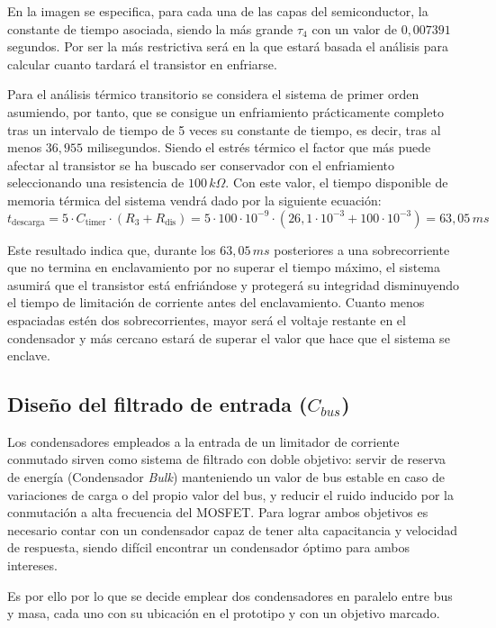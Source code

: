 \documentclass[12pt]{report} %
\begin{document}
En la imagen se especifica, para cada una de las capas del semiconductor, la constante de tiempo asociada, siendo la más grande $\tau_\text{4}$ con un valor de $0{,}007391$ segundos. Por ser la más restrictiva será en la que estará basada el análisis para calcular cuanto tardará el transistor en enfriarse. 

Para el análisis térmico transitorio se considera el sistema de primer orden asumiendo, por tanto, que se consigue un enfriamiento prácticamente completo tras un intervalo de tiempo de 5 veces su constante de tiempo, es decir, tras al menos $36{,}955$ milisegundos. Siendo el estrés térmico el factor que más puede afectar al transistor se ha buscado ser conservador con el enfriamiento seleccionando una resistencia de $100\,k\Omega$. Con este valor, el tiempo disponible de memoria térmica del sistema vendrá dado por la siguiente ecuación:\begin{equation}
    \label{eq:tauDescarga}
    t_\text{descarga} = 5\cdot C_\text{timer} \cdot (R_\text{3}+R_\text{dis})=5\cdot 100\cdot 10^{-9} \cdot (26{,}1 \cdot 10^{-3}+ 100\cdot 10^{-3}) = 63{,}05\, ms
\end{equation}

Este resultado indica que, durante los $63{,}05\, ms$ posteriores a una sobrecorriente que no termina en enclavamiento por no superar el tiempo máximo, el sistema asumirá que el transistor está enfriándose y protegerá su integridad disminuyendo el tiempo de limitación de corriente antes del enclavamiento. Cuanto menos espaciadas estén dos sobrecorrientes, mayor será el voltaje restante en el condensador y más cercano estará de superar el valor que hace que el sistema se enclave. 


\subsection{Diseño del filtrado de entrada ($C_{bus}$)}
Los condensadores empleados a la entrada de un limitador de corriente conmutado sirven como sistema de filtrado con doble objetivo: servir de reserva de energía (Condensador \textit{Bulk}) manteniendo un valor de bus estable en caso de variaciones de carga o del propio valor del bus, y reducir el ruido inducido por la conmutación a alta frecuencia del MOSFET. Para lograr ambos objetivos es necesario contar con un condensador capaz de tener alta capacitancia y velocidad de respuesta, siendo difícil encontrar un condensador óptimo para ambos intereses. 

Es por ello por lo que se decide emplear dos condensadores en paralelo entre bus y masa, cada uno con su ubicación en el prototipo y con un objetivo marcado. 
\end{document}
